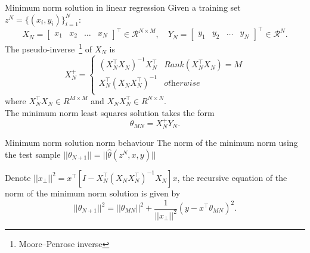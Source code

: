 \documentclass[aspectratio=169]{beamer}
\begin{document}
\begin{frame}{Minimum norm solution in linear regression}
Given a training set $z^N =\{(x_i,y_i)\}_{i=1}^N$:
\begin{equation} \label{eq:trainset_matrix}
X_N = 
\begin{bmatrix}
x_1 & x_2 & \dots & x_N
\end{bmatrix}^\top
\in \mathcal{R}^{N \times M},
\quad
Y_N = \begin{bmatrix} y_1 & y_2 & \dots & y_N \end{bmatrix}^\top
\in \mathcal{R}^{N}.
\end{equation}
The pseudo-inverse~\footnote{Moore–Penrose inverse} of $X_N$ is
\begin{equation} \label{eq:pseudo-inverse}
X_N^+ = 
\begin{cases} 
    (X_N^\top X_N)^{-1} X_N^\top & \textit{Rank}(X_N^\top X_N) = M\\ 
    X_N^\top (X_N X_N^\top )^{-1} & \textit{otherwise} \\   
\end{cases}
\end{equation}
where $X_N^\top X_N \in R^{M \times M}$ and $X_N X_N^\top \in R^{N \times N}$. 
\\
The minimum norm least squares solution takes the form
\begin{equation}
    \theta_{MN} = X_N^+ Y_N.
\end{equation}
\end{frame}


\begin{frame}{Minimum norm solution norm behaviour}
The norm of the minimum norm using the test sample $||\theta_{N+1}|| = ||\hat{\theta}\left(z^N,x,y \right)||$
\pause
\begin{theorem}
Denote $||x_\bot||^2 = x^\top \left[I - X_N^\top (X_N X_N^\top )^{-1} X_N \right] x$,
the recursive equation of the norm of the minimum norm solution is given by 
\begin{equation}  \label{eq:mn_solution_norm}
||\theta_{N+1}||^2 = ||\theta_{MN}||^2 + \frac{1}{||x_\bot||^2}(y-x^\top \theta_{MN})^2.
\end{equation}
\end{theorem}

\end{frame}
\end{document}

